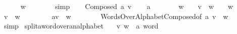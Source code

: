 \begin{isabellebody}
\ \ \isamarkupfalse%
\ {\isachardoublequoteopen}{\isacharparenleft}{\kern0pt}{\isasymepsilon}\ {\isasymcdot}\ w{\isacharparenright}{\kern0pt}\ {\isasymin}\ {\isasymSigma}\isactrlsup {\isacharasterisk}{\kern0pt}{\isachardoublequoteclose}\isanewline
\ \ \ \ \isamarkupfalse%
\ simp\isanewline
{}\isamarkupfalse%
\isanewline
\ \ \isamarkupfalse%
\ {\isacharparenleft}{\kern0pt}Composed\ a\ v{\isacharparenright}{\kern0pt}\isanewline
\ \ \isamarkupfalse%
\ {\isachardoublequoteopen}a\ {\isasymin}\ {\isasymSigma}{\isachardoublequoteclose}\isanewline
\ \ \isamarkupfalse%
\ \isamarkupfalse%
\ {\isachardoublequoteopen}w\ {\isasymin}\ {\isasymSigma}\isactrlsup {\isacharasterisk}{\kern0pt}\ {\isasymLongrightarrow}\ {\isacharparenleft}{\kern0pt}v\ {\isasymcdot}\ w{\isacharparenright}{\kern0pt}\ {\isasymin}\ {\isasymSigma}\isactrlsup {\isacharasterisk}{\kern0pt}{\isachardoublequoteclose}\ \ {\isachardoublequoteopen}w\ {\isasymin}\ {\isasymSigma}\isactrlsup {\isacharasterisk}{\kern0pt}{\isachardoublequoteclose}\isanewline
\ \ \isamarkupfalse%
\ {\isachardoublequoteopen}{\isacharparenleft}{\kern0pt}v\ {\isasymcdot}\ w{\isacharparenright}{\kern0pt}\ {\isasymin}\ {\isasymSigma}\isactrlsup {\isacharasterisk}{\kern0pt}{\isachardoublequoteclose}\ \isakeywordONE{{\isachardot}{\kern0pt}}\isamarkupfalse%
\isanewline
\ \ \isamarkupfalse%
\ \isamarkupfalse%
\ {\isachardoublequoteopen}{\isacharparenleft}{\kern0pt}{\isacharparenleft}{\kern0pt}a{\isacharhash}{\kern0pt}v{\isacharparenright}{\kern0pt}\ {\isasymcdot}\ w{\isacharparenright}{\kern0pt}\ {\isasymin}\ {\isasymSigma}\isactrlsup {\isacharasterisk}{\kern0pt}{\isachardoublequoteclose}\isanewline
\ \ \ \ \isamarkupfalse%
\ WordsOverAlphabet{\isachardot}{\kern0pt}Composed{\isacharbrackleft}{\kern0pt}of\ a\ {\isachardoublequoteopen}v\ {\isasymcdot}\ w{\isachardoublequoteclose}{\isacharbrackright}{\kern0pt}\isanewline
\ \ \ \ \isamarkupfalse%
\ simp\isanewline
{}\isamarkupfalse%
%
\endisatagproof
{\isafoldproof}%
%
\isadelimproof
\isanewline
%
\endisadelimproof
\isanewline
{}\isamarkupfalse%
\ split{\isacharunderscore}{\kern0pt}a{\isacharunderscore}{\kern0pt}word{\isacharunderscore}{\kern0pt}over{\isacharunderscore}{\kern0pt}an{\isacharunderscore}{\kern0pt}alphabet{\isacharcolon}{\kern0pt}\isanewline
\ \ \ v\ w\ {\isacharcolon}{\kern0pt}{\isacharcolon}{\kern0pt}\ {\isachardoublequoteopen}{\isacharprime}{\kern0pt}a\ word{\isachardoublequoteclose}\isanewline

\end{isabellebody}
